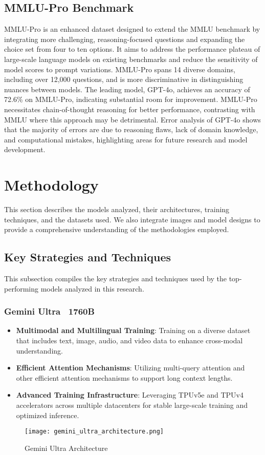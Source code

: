 \documentclass[journal]{IEEEtran}
\begin{document}
\subsection{MMLU-Pro Benchmark}
MMLU-Pro is an enhanced dataset designed to extend the MMLU benchmark by integrating more challenging, reasoning-focused questions and expanding the choice set from four to ten options. It aims to address the performance plateau of large-scale language models on existing benchmarks and reduce the sensitivity of model scores to prompt variations. MMLU-Pro spans 14 diverse domains, including over 12,000 questions, and is more discriminative in distinguishing nuances between models. The leading model, GPT-4o, achieves an accuracy of 72.6\% on MMLU-Pro, indicating substantial room for improvement. MMLU-Pro necessitates chain-of-thought reasoning for better performance, contrasting with MMLU where this approach may be detrimental. Error analysis of GPT-4o shows that the majority of errors are due to reasoning flaws, lack of domain knowledge, and computational mistakes, highlighting areas for future research and model development.

\section{Methodology}
This section describes the models analyzed, their architectures, training techniques, and the datasets used. We also integrate images and model designs to provide a comprehensive understanding of the methodologies employed.

\subsection{Key Strategies and Techniques}
This subsection compiles the key strategies and techniques used by the top-performing models analyzed in this research.

\subsubsection{Gemini Ultra ~1760B}
\begin{itemize}
    \item \textbf{Multimodal and Multilingual Training}: Training on a diverse dataset that includes text, image, audio, and video data to enhance cross-modal understanding.
    \item \textbf{Efficient Attention Mechanisms}: Utilizing multi-query attention and other efficient attention mechanisms to support long context lengths.
    \item \textbf{Advanced Training Infrastructure}: Leveraging TPUv5e and TPUv4 accelerators across multiple datacenters for stable large-scale training and optimized inference.
\end{itemize}
\begin{figure}[htbp]
\centerline{\texttt{[image: gemini\_ultra\_architecture.png]}}
\caption{Gemini Ultra Architecture}
\label{fig:gemini_ultra}
\end{figure}
\end{document}
